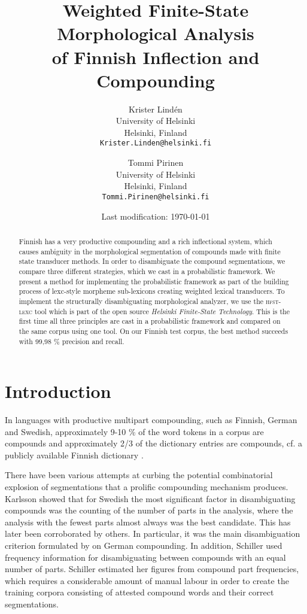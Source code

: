 \documentclass[postprint]{flammie}
\title{Weighted Finite-State Morphological Analysis\\
  of Finnish Inflection and Compounding\footnotepubrights{The official
  publication was in Nodalida 2009 organised in Odense,
  \url{http://beta.visl.sdu.dk/nodalida2009/}, the electronic publication was
  available at \url{http://dspace.utlib.ee/dspace/handle/10062/9206} on
  \today.}
  }
\author{Krister Lindén\\
  University of Helsinki\\
  Helsinki, Finland\\
  {\tt Krister.Linden@helsinki.fi} \and
  Tommi Pirinen\\
  University of Helsinki\\
  Helsinki, Finland\\
  {\tt Tommi.Pirinen@helsinki.fi} }
\date{Last modification: \today}
\begin{document}
\maketitle
\begin{abstract}
  Finnish has a very productive compounding and a rich inflectional
  system, which causes ambiguity in the morphological segmentation of
  compounds made with finite state transducer methods. In order to
  disambiguate the compound segmentations, we compare three different
  strategies, which we cast in a probabilistic framework. We present a
  method for implementing the probabilistic framework as part of the
  building process of lexc-style morpheme sub-lexicons creating
  weighted lexical transducers. To implement the structurally
  disambiguating morphological analyzer, we use the \textsc{hfst-lexc}
  tool which is part of the open source \emph{Helsinki Finite-State
    Technology}. This is the first time all three principles are cast
  in a probabilistic framework and compared on the same corpus using
  one tool. On our Finnish test corpus, the best method succeeds with
  99,98 \% precision and recall.
\end{abstract}

\section{Introduction}

In languages with productive multipart compounding, such as Finnish,
German and Swedish, approximately 9-10 \% of the word tokens in a
corpus are compounds \cite{hedlund/2002} and approximately 2/3 of the
dictionary entries are compounds, cf. a publicly available Finnish
dictionary \cite{kotus/2007}.

There have been various attempts at curbing the potential
combinatorial explosion of segmentations that a prolific compounding
mechanism produces. Karlsson \cite{karlsson/1992} showed that for
Swedish the most significant factor in disambiguating compounds was
the counting of the number of parts in the analysis, where the
analysis with the fewest parts almost always was the best
candidate. This has later been corroborated by others. In particular,
it was the main disambiguation criterion formulated by
\cite{schiller/2005} on German compounding. In addition, Schiller used
frequency information for disambiguating between compounds with an
equal number of parts. Schiller estimated her figures from compound
part frequencies, which requires a considerable amount of manual
labour in order to create the training corpora consisting of attested
compound words and their correct segmentations.
\end{document}
